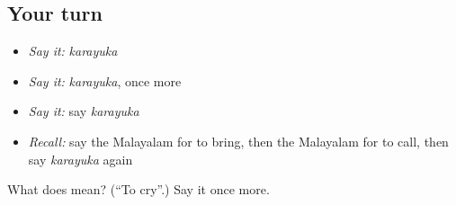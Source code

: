 \subsection*{Your turn}
\begin{itemize}
\raggedright
  \item \emph{Say it:} \emph{karayuka}
  \item \emph{Say it:} \emph{karayuka}, once more
  \item \emph{Say it:} say \emph{karayuka}
  \item \emph{Recall:} say the Malayalam for to bring, then the Malayalam for to call, then say \emph{karayuka} again
\end{itemize}

\begin{tcolorbox}[breakable,colback=teal!4,colframe=teal!35!black,title={Before you move on}]
What does  mean? (\textquotedblleft{}To cry\textquotedblright{}.) Say it once more.
\end{tcolorbox}
